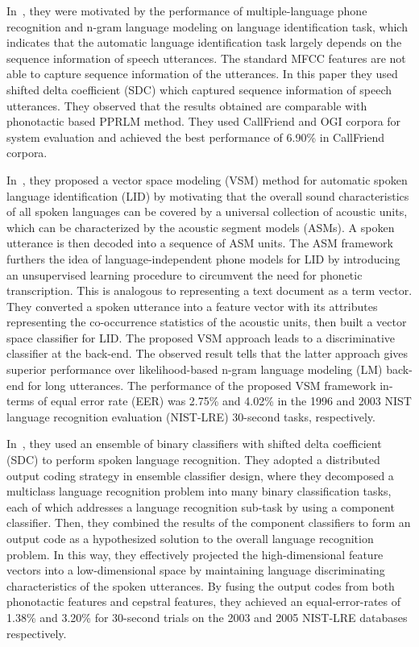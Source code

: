 \begin{spacing}{1.5}
In~\cite{torres2002approaches}, they were motivated by the performance of multiple-language phone recognition and n-gram language modeling on language identification task, which indicates that the automatic language identification task largely depends on the sequence information of speech utterances. The standard MFCC features are not able to capture sequence information of the utterances. In this paper they used shifted delta coefficient (SDC) which captured sequence information of speech utterances. They observed that the results obtained are comparable with phonotactic based PPRLM method. They used CallFriend and OGI corpora for system evaluation and achieved the best performance of 6.90\% in CallFriend corpora.


In~\cite{li2007vector}, they proposed a vector space modeling (VSM) method for automatic spoken language identification (LID) by motivating that the overall sound characteristics of all spoken languages can be covered by a universal collection of acoustic units, which can be characterized by the acoustic segment models (ASMs). A spoken utterance is then decoded into a sequence of ASM units. The ASM framework furthers the idea of language-independent phone models for LID by introducing an unsupervised learning procedure to circumvent the need for phonetic transcription. This is analogous to representing a text document as a term vector.  They converted a spoken utterance into a feature vector with its attributes representing the co-occurrence statistics of the acoustic units, then built a vector space classifier for LID. The proposed VSM approach leads to a discriminative classifier at the back-end. The observed result tells that the latter approach gives superior performance over likelihood-based n-gram language modeling (LM) back-end for long utterances. The performance of the proposed VSM framework in-terms of equal error rate (EER) was 2.75\% and 4.02\% in the 1996 and 2003 NIST language recognition evaluation (NIST-LRE) 30-second tasks, respectively.

In~\cite{ma2007spoken}, they used an ensemble of binary classifiers with shifted delta coefficient (SDC) to perform spoken language recognition. They adopted a distributed output coding strategy in ensemble classifier design, where they decomposed a multiclass language recognition problem into many binary classification tasks, each of which addresses a language recognition sub-task by using a component classifier. Then, they combined the results of the component classifiers to form an output code as a hypothesized solution to the overall language recognition problem. In this way, they effectively projected the high-dimensional feature vectors into a low-dimensional space by maintaining language discriminating characteristics of the spoken utterances. By fusing the output codes from both phonotactic features and cepstral features, they achieved an equal-error-rates of 1.38\% and 3.20\% for 30-second trials on the 2003 and 2005 NIST-LRE databases respectively.




\end{spacing}
